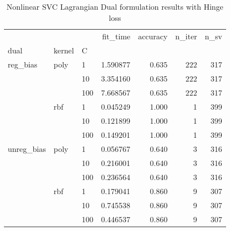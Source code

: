 \begin{table}[H]
\centering
\caption{Nonlinear SVC Lagrangian Dual formulation results with Hinge loss}
\label{nonlinear_lagrangian_dual_l1_svc_cv_results}
\begin{tabular}{lllrrrr}
\toprule
           &     &     &  fit\_time &  accuracy &  n\_iter &  n\_sv \\
dual & kernel & C &           &           &         &       \\
\midrule
reg\_bias & poly & 1   &  1.590877 &     0.635 &     222 &   317 \\
           &     & 10  &  3.354160 &     0.635 &     222 &   317 \\
           &     & 100 &  7.668567 &     0.635 &     222 &   317 \\
           & rbf & 1   &  0.045249 &     1.000 &       1 &   399 \\
           &     & 10  &  0.121899 &     1.000 &       1 &   399 \\
           &     & 100 &  0.149201 &     1.000 &       1 &   399 \\
unreg\_bias & poly & 1   &  0.056767 &     0.640 &       3 &   316 \\
           &     & 10  &  0.216001 &     0.640 &       3 &   316 \\
           &     & 100 &  0.236564 &     0.640 &       3 &   316 \\
           & rbf & 1   &  0.179041 &     0.860 &       9 &   307 \\
           &     & 10  &  0.745538 &     0.860 &       9 &   307 \\
           &     & 100 &  0.446537 &     0.860 &       9 &   307 \\
\bottomrule
\end{tabular}
\end{table}
